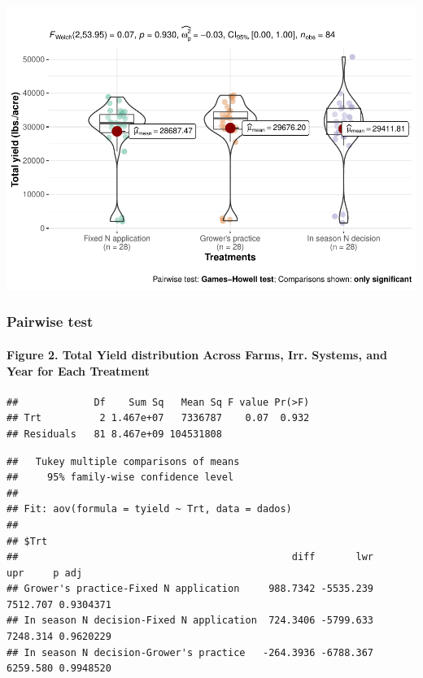 \documentclass[
]{article}
\begin{document}
\includegraphics{NoffsiteT_files/figure-latex/unnamed-chunk-3-1.pdf}

\hypertarget{pairwise-test}{%
\subsubsection{\texorpdfstring{\textbf{Pairwise
test}}{Pairwise test}}\label{pairwise-test}}

\hypertarget{figure-2.-total-yield-distribution-across-farms-irr.-systems-and-year-for-each-treatment-1}{%
\paragraph{\texorpdfstring{\textbf{Figure 2.} Total Yield distribution
Across Farms, Irr. Systems, and Year for Each
Treatment}{Figure 2. Total Yield distribution Across Farms, Irr. Systems, and Year for Each Treatment}}\label{figure-2.-total-yield-distribution-across-farms-irr.-systems-and-year-for-each-treatment-1}}

\begin{verbatim}
##             Df    Sum Sq   Mean Sq F value Pr(>F)
## Trt          2 1.467e+07   7336787    0.07  0.932
## Residuals   81 8.467e+09 104531808
\end{verbatim}

\begin{verbatim}
##   Tukey multiple comparisons of means
##     95% family-wise confidence level
## 
## Fit: aov(formula = tyield ~ Trt, data = dados)
## 
## $Trt
##                                               diff       lwr      upr     p adj
## Grower's practice-Fixed N application     988.7342 -5535.239 7512.707 0.9304371
## In season N decision-Fixed N application  724.3406 -5799.633 7248.314 0.9620229
## In season N decision-Grower's practice   -264.3936 -6788.367 6259.580 0.9948520
\end{verbatim}
\end{document}
